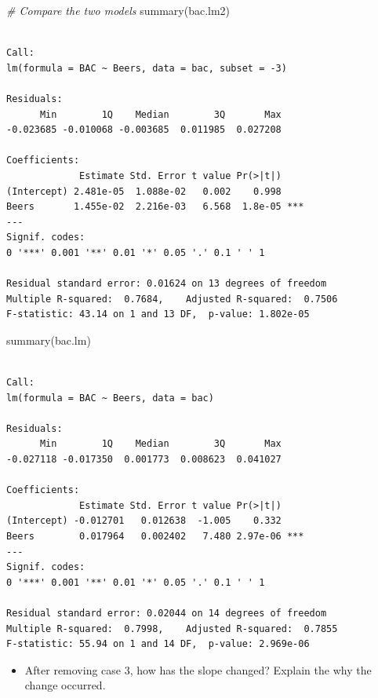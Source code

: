\documentclass[
]{book}
\newenvironment{Shaded}{\begin{snugshade}}{\end{snugshade}}
\newcommand{\CommentTok}[1]{\textcolor[rgb]{0.56,0.35,0.01}{\textit{#1}}}
\newcommand{\FunctionTok}[1]{\textcolor[rgb]{0.00,0.00,0.00}{#1}}
\newcommand{\NormalTok}[1]{#1}
\providecommand{\tightlist}{%
  \setlength{\itemsep}{0pt}\setlength{\parskip}{0pt}}
\begin{document}
\begin{Shaded}
\begin{Highlighting}[]
\CommentTok{\# Compare the two models}
\FunctionTok{summary}\NormalTok{(bac.lm2)}
\end{Highlighting}
\end{Shaded}

\begin{verbatim}

Call:
lm(formula = BAC ~ Beers, data = bac, subset = -3)

Residuals:
      Min        1Q    Median        3Q       Max 
-0.023685 -0.010068 -0.003685  0.011985  0.027208 

Coefficients:
             Estimate Std. Error t value Pr(>|t|)    
(Intercept) 2.481e-05  1.088e-02   0.002    0.998    
Beers       1.455e-02  2.216e-03   6.568  1.8e-05 ***
---
Signif. codes:  
0 '***' 0.001 '**' 0.01 '*' 0.05 '.' 0.1 ' ' 1

Residual standard error: 0.01624 on 13 degrees of freedom
Multiple R-squared:  0.7684,    Adjusted R-squared:  0.7506 
F-statistic: 43.14 on 1 and 13 DF,  p-value: 1.802e-05
\end{verbatim}

\begin{Shaded}
\begin{Highlighting}[]
\FunctionTok{summary}\NormalTok{(bac.lm)}
\end{Highlighting}
\end{Shaded}

\begin{verbatim}

Call:
lm(formula = BAC ~ Beers, data = bac)

Residuals:
      Min        1Q    Median        3Q       Max 
-0.027118 -0.017350  0.001773  0.008623  0.041027 

Coefficients:
             Estimate Std. Error t value Pr(>|t|)    
(Intercept) -0.012701   0.012638  -1.005    0.332    
Beers        0.017964   0.002402   7.480 2.97e-06 ***
---
Signif. codes:  
0 '***' 0.001 '**' 0.01 '*' 0.05 '.' 0.1 ' ' 1

Residual standard error: 0.02044 on 14 degrees of freedom
Multiple R-squared:  0.7998,    Adjusted R-squared:  0.7855 
F-statistic: 55.94 on 1 and 14 DF,  p-value: 2.969e-06
\end{verbatim}

\begin{itemize}
\tightlist
\item
  After removing case 3, how has the slope changed? Explain the why the change occurred.
\end{itemize}
\end{document}
